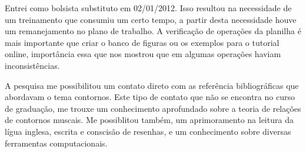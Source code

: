 \documentclass[11pt]{article}
\begin{document}
Entrei como bolsista substituto em 02/01/2012. Isso resultou na
necessidade de um treinamento que consumiu um certo tempo, a partir
desta necessidade houve um remanejamento no plano de trabalho.
A verificação de operações da planilha é mais importante que criar o
banco de figuras ou os exemplos para o tutorial online, importância
essa que nos mostrou que em algumas operações haviam inconsistências.

A pesquisa me possibilitou um contato direto com as referência bibliográficas que abordavam
o tema contornos.
Este tipo de contato que não se encontra no curso de graduação,
me trouxe um conhecimento aprofundado sobre a teoria de relações de contornos muscais.
Me possiblitou também, um aprimoramento na leitura da lígua inglesa, escrita e conscisão
de resenhas, e um conhecimento sobre diversas ferramentas computacionais.


\renewcommand{\refname}{Referências bibliográficas (máximo 15)}

\nocite{
  Friedmann1985,
  Friedmann1987,
  Morris1987,
  Marvin1987,
  Marvin1988,
  Polansky1992,
  Morris1993,
  Clifford1995,
  Quinn1997,
  Beard2003,
  Sampaio2008,
  Schultz2008,
  Schultz2009,
  Bor2009
}





\end{document}
